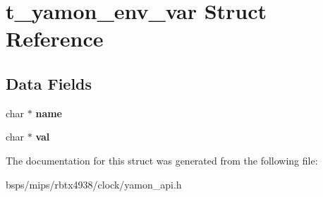 \hypertarget{structt__yamon__env__var}{}\section{t\+\_\+yamon\+\_\+env\+\_\+var Struct Reference}
\label{structt__yamon__env__var}
\subsection*{Data Fields}
\begin{DoxyCompactItemize}
\item 
\mbox{\label{structt__yamon__env__var_a24e477392d22c0027fcc9c73f2189607}} 
char $\ast$ {\bfseries name}
\item 
\mbox{\label{structt__yamon__env__var_ad65b3b2df1433bbc63cc65e56c987142}} 
char $\ast$ {\bfseries val}
\end{DoxyCompactItemize}


The documentation for this struct was generated from the following file\+:\begin{DoxyCompactItemize}
\item 
bsps/mips/rbtx4938/clock/yamon\+\_\+api.\+h\end{DoxyCompactItemize}
